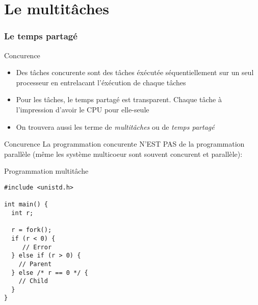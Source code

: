 %                                                                                                               
%
%

\part{Le multitâches}

\begin{frame}
  \partpage
\end{frame}

\begin{frame}
  \tableofcontents[currentpart]
\end{frame}

\section{Le temps partagé}

\begin{frame}{Concurence}
  \begin{itemize}
  \item   Des    tâches   concurente   sont    des   tâches   éxécutée
    séquentiellement sur un seul processeur en entrelacant l'éxécution
    de chaque tâches
  \item  Pour les tâches,  le temps  partagé est  transparent.  Chaque
    tâche à l'impression d'avoir le CPU pour elle-seule
  \item  On  trouvera aussi  les  terme  de  \emph{multitâches} ou  de
    \emph{temps partagé}
  \end{itemize}
\end{frame} 

\begin{frame}{Concurence}
   La programmation concurente N'EST  PAS de la programmation parallèle
  (même les système multicoeur sont souvent concurent et parallèle):
  \begin{center}
  \end{center}
\end{frame}

\begin{frame}[fragile]{Programmation multitâche}
\begin{lstlisting}
#include <unistd.h>

int main() {
  int r;

  r = fork();
  if (r < 0) {
     // Error
  } else if (r > 0) {
    // Parent
  } else /* r == 0 */ {
    // Child
  }
}
\end{lstlisting} 
\end{frame} 

